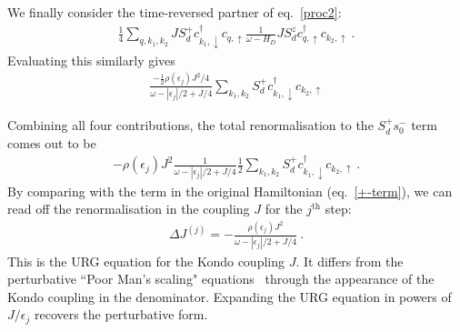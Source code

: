 We finally consider the time-reversed partner of eq.~\ref{proc2}:
\begin{equation}\begin{aligned}
	\frac{1}{4}\sum_{q, k_1, k_2}J S_d^+ c^\dagger_{k_1,\downarrow} c_{q, \uparrow} \frac{1}{\omega - H_D} J S_d^z c^\dagger_{q, \uparrow} c_{k_2, \uparrow}~.
\end{aligned}\end{equation}
Evaluating this similarly gives
\begin{equation}\begin{aligned}
\frac{-\frac{1}{2} \rho(\epsilon_j)J^2 / 4}{\omega - |\epsilon_j|/2 + J/4} \sum_{k_1, k_2}S_d^+ c^\dagger_{k_1, \downarrow} c_{k_2, \uparrow}
\end{aligned}\end{equation}

Combining all four contributions, the total renormalisation to the \(S_d^+ s_0^-\) term comes out to be
\begin{equation}\begin{aligned}
-\rho(\epsilon_j)J^2\frac{1}{\omega - |\epsilon_j|/2 + J/4} \frac{1}{2}\sum_{k_1, k_2}S_d^+ c^\dagger_{k_1, \downarrow} c_{k_2, \uparrow}~.
\end{aligned}\end{equation}
By comparing with the term in the original Hamiltonian (eq.~\ref{+-term}), we can read off the renormalisation in the coupling \(J\) for the \(j^\text{th}\) step:
\begin{equation}\begin{aligned}
	\Delta J^{(j)} = -\frac{\rho(\epsilon_j)J^2}{\omega - |\epsilon_j|/2 + J/4}~.
\end{aligned}\end{equation}
This is the URG equation for the Kondo coupling \(J\). It differs from the perturbative ``Poor Man's scaling" equations~\cite{anderson1970poor} through the appearance of the Kondo coupling in the denominator. Expanding the URG equation in powers of \(J/\epsilon_j\) recovers the perturbative form.

